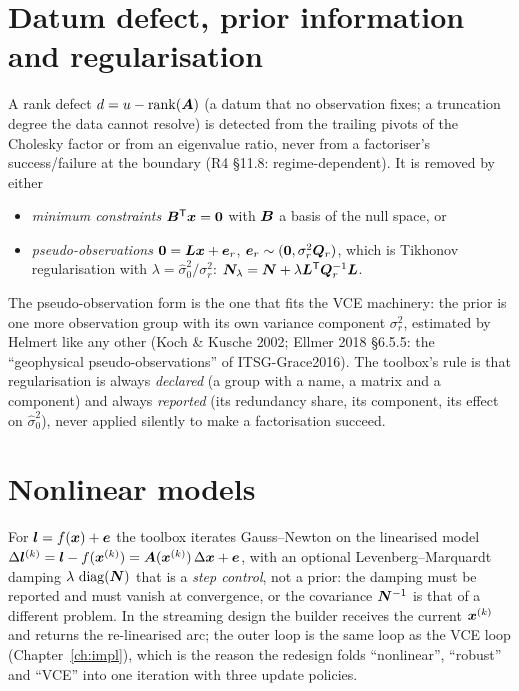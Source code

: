 \section{Datum defect, prior information and regularisation}
\label{sec:reg}

A rank defect $d = u - \operatorname{rank}(\bm{A})$ (a datum that no observation fixes; a truncation degree the data cannot resolve) is detected from the trailing pivots of the Cholesky factor or from an eigenvalue ratio, never from a factoriser's success/failure at the boundary (R4 §11.8: regime-dependent). It is removed by either
\begin{itemize}
\item \emph{minimum constraints} $\bm{B}^{\mathsf T}\bm{x} = \bm{0}$ with $\bm{B}$ a basis of the null space, or
\item \emph{pseudo-observations} $\bm{0} = \bm{L}\bm{x} + \bm{e}_r$, $\bm{e}_r\sim(\bm{0},\sigma_r^2\bm{Q}_r)$, which is Tikhonov regularisation with $\lambda = \hat\sigma_0^2/\sigma_r^2$: $\bm{N}_\lambda = \bm{N} + \lambda\bm{L}^{\mathsf T}\bm{Q}_r^{-1}\bm{L}$.
\end{itemize}
The pseudo-observation form is the one that fits the VCE machinery: the prior is one more observation group with its own variance component $\sigma_r^2$, estimated by Helmert like any other (Koch \& Kusche 2002; Ellmer 2018 §6.5.5: the ``geophysical pseudo-observations'' of ITSG-Grace2016). The toolbox's rule is that regularisation is always \emph{declared} (a group with a name, a matrix and a component) and always \emph{reported} (its redundancy share, its component, its effect on $\hat\sigma_0^2$), never applied silently to make a factorisation succeed.

\section{Nonlinear models}

For $\bm{l} = f(\bm{x}) + \bm{e}$ the toolbox iterates Gauss--Newton on the linearised model $\Delta\bm{l}^{(k)} = \bm{l} - f(\bm{x}^{(k)}) = \bm{A}(\bm{x}^{(k)})\,\Delta\bm{x} + \bm{e}$, with an optional Levenberg--Marquardt damping $\lambda\,\operatorname{diag}(\bm{N})$ that is a \emph{step control}, not a prior: the damping must be reported and must vanish at convergence, or the covariance $\bm{N}^{-1}$ is that of a different problem. In the streaming design the builder receives the current $\bm{x}^{(k)}$ and returns the re-linearised arc; the outer loop is the same loop as the VCE loop (Chapter~\ref{ch:impl}), which is the reason the redesign folds ``nonlinear'', ``robust'' and ``VCE'' into one iteration with three update policies.

